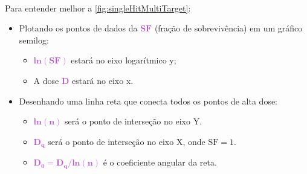 \documentclass[11pt,a4paper]{article}
\begin{document}
	\

	\begin{tcolorbox}[width=\textwidth, colback={white}, colbacktitle={DarkTurquoise!50!white}, title={$\bigstar$ \LobsterTwo{Para entender melhor: Gráfico do Modelo de Múltiplos Alvos, Hit Único } $\bigstar $}, coltitle={CarnationPink}, colframe={DarkTurquoise}, fonttitle=\rmfamily\bfseries\Large]

		Para entender melhor a \ref{fig:singleHitMultiTarget}:
		
		\begin{itemize}
			\item Plotando os pontos de dados da \textcolor{MediumOrchid}{$\mathbf{SF}$} (fração de sobrevivência) em um gráfico semilog:
			\begin{itemize}[label=\textcolor{CarnationPink}{$\star$}]
				\item \textcolor{MediumOrchid}{$\mathbf{ln(SF)}$} estará no eixo logarítmico y;
				\item A dose \textcolor{MediumOrchid}{$\mathbf{D}$} estará no eixo x.
			\end{itemize}
			
			\item Desenhando uma linha reta que conecta todos os pontos de alta dose:
			\begin{itemize}[label=\textcolor{CarnationPink}{$\star$}]
				\item \textcolor{MediumOrchid}{$\mathbf{ln(n)}$} será o ponto de interseção no eixo Y.
				\item \textcolor{MediumOrchid}{$\mathbf{D_q}$} será o ponto de interseção no eixo X, onde $\text{SF} = 1$.
				\item \textcolor{MediumOrchid}{$\mathbf{D_0 = D_q / ln(n)}$} é o coeficiente angular da reta. 
			\end{itemize}
		\end{itemize}
	\end{tcolorbox}
	
	\
\end{document}
